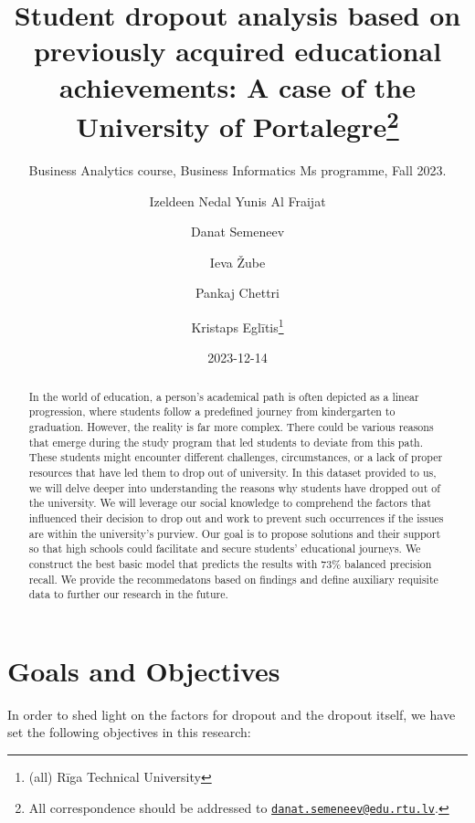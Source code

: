 \documentclass[
  letterpaper,
  DIV=11,
  numbers=noendperiod]{scrartcl}
\title{Student dropout analysis based on previously acquired educational
achievements: A case of the University of Portalegre\thanks{All
correspondence should be addressed to
\href{mailto:danat.semeneev@edu.rtu.lv}{\nolinkurl{danat.semeneev@edu.rtu.lv}}.}}
\subtitle{Business Analytics course, Business Informatics Ms programme,
Fall 2023.}
\author{Izeldeen Nedal Yunis Al Fraijat \and Danat Semeneev \and Ieva
Žube \and Pankaj Chettri \and Kristaps Eglītis\footnote{(all) Rīga
  Technical University}}
\date{2023-12-14}
\renewcommand*\contentsname{Table of contents}
\newcommand\contentsname{Table of contents}
\begin{document}
\maketitle
\begin{abstract}
In the world of education, a person's academical path is often depicted
as a linear progression, where students follow a predefined journey from
kindergarten to graduation. However, the reality is far more complex.
There could be various reasons that emerge during the study program that
led students to deviate from this path. These students might encounter
different challenges, circumstances, or a lack of proper resources that
have led them to drop out of university. In this dataset provided to us,
we will delve deeper into understanding the reasons why students have
dropped out of the university. We will leverage our social knowledge to
comprehend the factors that influenced their decision to drop out and
work to prevent such occurrences if the issues are within the
university's purview. Our goal is to propose solutions and their support
so that high schools could facilitate and secure students' educational
journeys. We construct the best basic model that predicts the results
with 73\% balanced precision recall. We provide the recommedatons based
on findings and define auxiliary requisite data to further our research
in the future.
\end{abstract}
\ifdefined\Shaded\renewenvironment{Shaded}{\begin{tcolorbox}[interior hidden, boxrule=0pt, sharp corners, frame hidden, borderline west={3pt}{0pt}{shadecolor}, breakable, enhanced]}{\end{tcolorbox}}\fi

\renewcommand*\contentsname{Table of contents}
{
\hypersetup{linkcolor=}
\setcounter{tocdepth}{3}
\tableofcontents
}

\hypertarget{goals-and-objectives}{%
\section{Goals and Objectives}\label{goals-and-objectives}}

In order to shed light on the factors for dropout and the dropout
itself, we have set the following objectives in this research:
\end{document}
